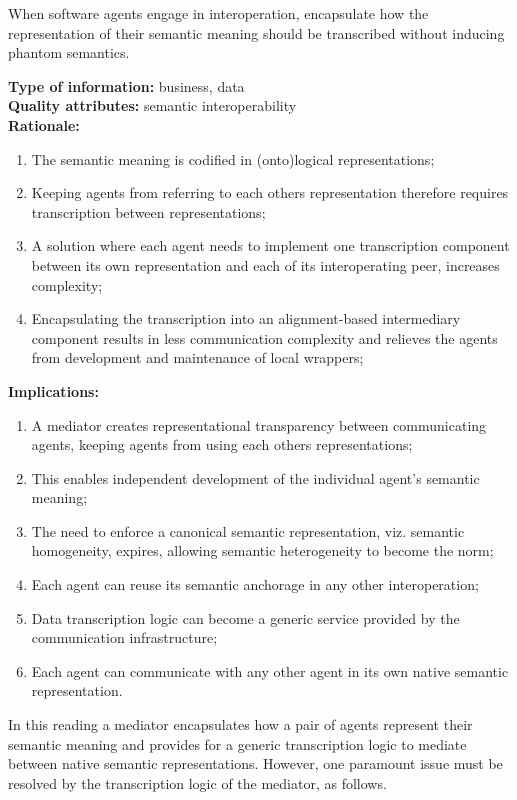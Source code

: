 \documentclass[sort&compress,preprint,authoryear,3p,twocolumn]{elsarticle}
\begin{document}
\begin{mmdp}\label{dp:mediation}

When software agents engage in interoperation, encapsulate how the representation of their semantic meaning should be transcribed without inducing phantom semantics.   

\textbf{Type of information:} business, data  \\
\textbf{Quality attributes:} semantic interoperability   \\
\textbf{Rationale:}
\begin{enumerate}
  \item The semantic meaning is codified in (onto)logical representations;
  \item Keeping agents from referring to each others representation therefore requires transcription between representations;
  \item A solution where each agent needs to implement one transcription component between its own representation and each of its interoperating peer, increases complexity;
  \item Encapsulating the transcription into an alignment-based intermediary component results in less communication complexity and relieves the agents from development and maintenance of local wrappers;
\end{enumerate}
\textbf{Implications:}
\begin{enumerate}
  \item A mediator creates representational transparency between communicating agents, keeping agents from using each others representations;
  \item This enables independent development of the individual agent's semantic meaning;
  \item The need to enforce a canonical semantic representation, viz. semantic homogeneity, expires, allowing semantic heterogeneity to become the norm;
  \item Each agent can reuse its semantic anchorage in any other interoperation;
  \item Data transcription logic can become a generic service provided by the communication infrastructure;
  \item Each agent can communicate with any other agent in its own native semantic representation.
\end{enumerate}  
\end{mmdp}

In this reading a mediator encapsulates how a pair of agents represent
their semantic meaning and provides for a generic transcription logic to
mediate between native semantic representations. However, one paramount
issue must be resolved by the transcription logic of the mediator, as
follows.
\end{document}
